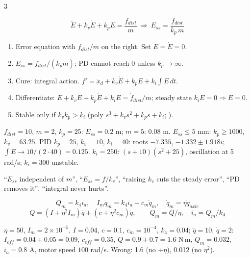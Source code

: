 \begin{multicols}{3}
\begin{fbx}
\[\ddot E+k_v\dot E+k_pE=\frac{f_{dist}}m\ \Rightarrow\ E_{ss}=\frac{f_{dist}}{k_p\,m}\]
\end{fbx}
\begin{recipe}
\label{w8:sse}
\begin{enumerate}
\item Error equation with $f_{dist}/m$ on the right. Set $\ddot E=\dot E=0$.
\item $E_{ss}=f_{dist}/(k_pm)$; PD cannot reach 0 unless $k_p\to\infty$.
\item Cure: integral action. $f'=\ddot x_d+k_v\dot E+k_pE+k_i\!\int\!E\,dt$.
\item Differentiate: $\dddot E+k_v\ddot E+k_p\dot E+k_iE=\dot f_{dist}/m$; steady state $k_iE=0\Rightarrow E=0$.
\item Stable only if $k_vk_p>k_i$ (poly $s^3+k_vs^2+k_ps+k_i$; \added).
\end{enumerate}
\end{recipe}
\begin{worked}
$f_{dist}=10$, $m=2$, $k_p=25$: $E_{ss}=0.2$ m; $m=5$: $0.08$ m. $E_{ss}\le5$ mm: $k_p\ge1000$, $k_v=63.25$. PID $k_p{=}25$, $k_v{=}10$, $k_i{=}40$: roots $-7.335$, $-1.332\pm1.918i$; $\int E\to10/(2\cdot40)=0.125$. $k_i{=}250$: $(s+10)(s^2+25)$, oscillation at 5 rad/s; $k_i{=}300$ unstable. \chk
\end{worked}
\begin{trap}
``$E_{ss}$ independent of $m$'', ``$E_{ss}=f/k_v$'', ``raising $k_v$ cuts the steady error'', ``PD removes it'', ``integral never hurts''.
\end{trap}

\begin{fbx}
\[Q_m=k_4i_a,\quad I_m\ddot q_m=k_4i_a-c_m\dot q_m,\quad \dot q_m=\eta\dot q_{axle}\]
\[Q=(I+\eta^2I_m)\ddot q+(c+\eta^2c_m)\dot q,\qquad Q_m=Q/\eta,\quad i_a=Q_m/k_4\]
\end{fbx}
\begin{worked}
$\eta=50$, $I_m=2{\times}10^{-5}$, $I=0.04$, $c=0.1$, $c_m=10^{-4}$, $k_4=0.04$; $\ddot q=10$, $\dot q=2$: $I_{eff}=0.04{+}0.05=0.09$, $c_{eff}=0.35$, $Q=0.9+0.7=1.6$ N\,m, $Q_m=0.032$, $i_a=0.8$ A, motor speed $100$ rad/s. Wrong: 1.6 (no $\div\eta$), 0.012 (no $\eta^2$). \chk
\end{worked}
\end{multicols}
